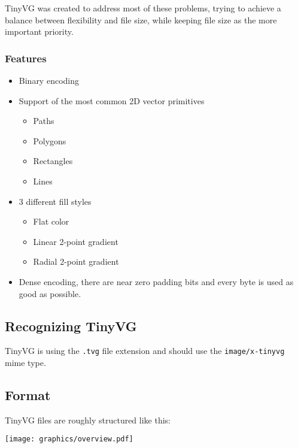 \documentclass[]{article}
\providecommand{\tightlist}{%
  \setlength{\itemsep}{0pt}\setlength{\parskip}{0pt}}
\begin{document}
TinyVG was created to address most of these problems, trying to achieve a
balance between flexibility and file size, while keeping file size as
the more important priority.

\hypertarget{features}{%
\subsubsection{Features}\label{features}}

\begin{itemize}
\tightlist
\item
  Binary encoding
\item
  Support of the most common 2D vector primitives

  \begin{itemize}
  \tightlist
  \item
    Paths
  \item
    Polygons
  \item
    Rectangles
  \item
    Lines
  \end{itemize}
\item
  3 different fill styles

  \begin{itemize}
  \tightlist
  \item
    Flat color
  \item
    Linear 2-point gradient
  \item
    Radial 2-point gradient
  \end{itemize}
\item
  Dense encoding, there are near zero padding bits and every byte is
  used as good as possible.
\end{itemize}

\hypertarget{recognition}{\subsection{Recognizing TinyVG}\label{recognition}}

TinyVG is using the \texttt{.tvg} file extension and should use the \texttt{image/x-tinyvg} mime type.

\hypertarget{format}{\subsection{Format}\label{format}}

TinyVG files are roughly structured like this:

\texttt{[image: graphics/overview.pdf]}
\end{document}

